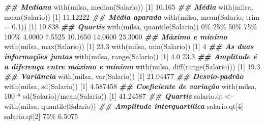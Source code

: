 \documentclass[
  10pt,
  a4paper]{book}
\newenvironment{Shaded}{\begin{snugshade}}{\end{snugshade}}
\newcommand{\AttributeTok}[1]{\textcolor[rgb]{0.77,0.63,0.00}{#1}}
\newcommand{\DecValTok}[1]{\textcolor[rgb]{0.00,0.00,0.81}{#1}}
\newcommand{\DocumentationTok}[1]{\textcolor[rgb]{0.56,0.35,0.01}{\textbf{\textit{#1}}}}
\newcommand{\FloatTok}[1]{\textcolor[rgb]{0.00,0.00,0.81}{#1}}
\newcommand{\FunctionTok}[1]{\textcolor[rgb]{0.00,0.00,0.00}{#1}}
\newcommand{\NormalTok}[1]{#1}
\newcommand{\OtherTok}[1]{\textcolor[rgb]{0.56,0.35,0.01}{#1}}
\newcommand{\SpecialCharTok}[1]{\textcolor[rgb]{0.00,0.00,0.00}{#1}}
\begin{document}
\begin{Shaded}
\begin{Highlighting}[]
\DocumentationTok{\#\# Mediana}
\FunctionTok{with}\NormalTok{(milsa, }\FunctionTok{median}\NormalTok{(Salario))}
\NormalTok{[}\DecValTok{1}\NormalTok{] }\FloatTok{10.165}
\DocumentationTok{\#\# Média}
\FunctionTok{with}\NormalTok{(milsa, }\FunctionTok{mean}\NormalTok{(Salario))}
\NormalTok{[}\DecValTok{1}\NormalTok{] }\FloatTok{11.12222}
\DocumentationTok{\#\# Média aparada}
\FunctionTok{with}\NormalTok{(milsa, }\FunctionTok{mean}\NormalTok{(Salario, }\AttributeTok{trim =} \FloatTok{0.1}\NormalTok{))}
\NormalTok{[}\DecValTok{1}\NormalTok{] }\FloatTok{10.838}
\DocumentationTok{\#\# Quartis}
\FunctionTok{with}\NormalTok{(milsa, }\FunctionTok{quantile}\NormalTok{(Salario))}
     \DecValTok{0}\SpecialCharTok{\%     25\%}     \DecValTok{50}\SpecialCharTok{\%     75\%}    \DecValTok{100}\NormalTok{\% }
 \FloatTok{4.0000}  \FloatTok{7.5525} \FloatTok{10.1650} \FloatTok{14.0600} \FloatTok{23.3000} 
\DocumentationTok{\#\# Máximo e mínimo}
\FunctionTok{with}\NormalTok{(milsa, }\FunctionTok{max}\NormalTok{(Salario))}
\NormalTok{[}\DecValTok{1}\NormalTok{] }\FloatTok{23.3}
\FunctionTok{with}\NormalTok{(milsa, }\FunctionTok{min}\NormalTok{(Salario))}
\NormalTok{[}\DecValTok{1}\NormalTok{] }\DecValTok{4}
\DocumentationTok{\#\# As duas informações juntas}
\FunctionTok{with}\NormalTok{(milsa, }\FunctionTok{range}\NormalTok{(Salario))}
\NormalTok{[}\DecValTok{1}\NormalTok{]  }\FloatTok{4.0} \FloatTok{23.3}
\DocumentationTok{\#\# Amplitude é a diferença entre máximo e mínimo}
\FunctionTok{with}\NormalTok{(milsa, }\FunctionTok{diff}\NormalTok{(}\FunctionTok{range}\NormalTok{(Salario)))}
\NormalTok{[}\DecValTok{1}\NormalTok{] }\FloatTok{19.3}
\DocumentationTok{\#\# Variância}
\FunctionTok{with}\NormalTok{(milsa, }\FunctionTok{var}\NormalTok{(Salario))}
\NormalTok{[}\DecValTok{1}\NormalTok{] }\FloatTok{21.04477}
\DocumentationTok{\#\# Desvio{-}padrão}
\FunctionTok{with}\NormalTok{(milsa, }\FunctionTok{sd}\NormalTok{(Salario))}
\NormalTok{[}\DecValTok{1}\NormalTok{] }\FloatTok{4.587458}
\DocumentationTok{\#\# Coeficiente de variação}
\FunctionTok{with}\NormalTok{(milsa, }\DecValTok{100} \SpecialCharTok{*} \FunctionTok{sd}\NormalTok{(Salario)}\SpecialCharTok{/}\FunctionTok{mean}\NormalTok{(Salario))}
\NormalTok{[}\DecValTok{1}\NormalTok{] }\FloatTok{41.24587}
\DocumentationTok{\#\# Quartis}
\NormalTok{salario.qt }\OtherTok{\textless{}{-}} \FunctionTok{with}\NormalTok{(milsa, }\FunctionTok{quantile}\NormalTok{(Salario))}
\DocumentationTok{\#\# Amplitude interquartílica}
\NormalTok{salario.qt[}\DecValTok{4}\NormalTok{] }\SpecialCharTok{{-}}\NormalTok{ salario.qt[}\DecValTok{2}\NormalTok{]}
   \DecValTok{75}\NormalTok{\% }
\FloatTok{6.5075} 
\end{Highlighting}
\end{Shaded}
\end{document}
